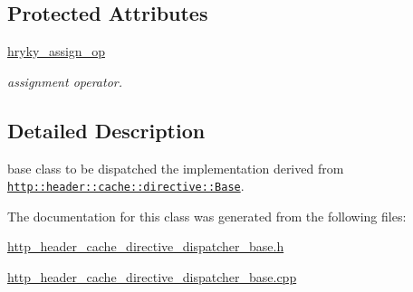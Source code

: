 \subsection*{Protected Attributes}
\begin{DoxyCompactItemize}
\item 
\hypertarget{classhryky_1_1http_1_1header_1_1cache_1_1directive_1_1dispatcher_1_1_base_ad246ce08b46e4326da5380150b8e46d9}{\hyperlink{classhryky_1_1http_1_1header_1_1cache_1_1directive_1_1dispatcher_1_1_base_ad246ce08b46e4326da5380150b8e46d9}{hryky\-\_\-assign\-\_\-op}}\label{classhryky_1_1http_1_1header_1_1cache_1_1directive_1_1dispatcher_1_1_base_ad246ce08b46e4326da5380150b8e46d9}

\begin{DoxyCompactList}\small\item\em assignment operator. \end{DoxyCompactList}\end{DoxyCompactItemize}


\subsection{Detailed Description}
base class to be dispatched the implementation derived from \href{http::header::cache::directive::Base}{\tt http\-::header\-::cache\-::directive\-::\-Base}. 

The documentation for this class was generated from the following files\-:\begin{DoxyCompactItemize}
\item 
\hyperlink{http__header__cache__directive__dispatcher__base_8h}{http\-\_\-header\-\_\-cache\-\_\-directive\-\_\-dispatcher\-\_\-base.\-h}\item 
\hyperlink{http__header__cache__directive__dispatcher__base_8cpp}{http\-\_\-header\-\_\-cache\-\_\-directive\-\_\-dispatcher\-\_\-base.\-cpp}\end{DoxyCompactItemize}
